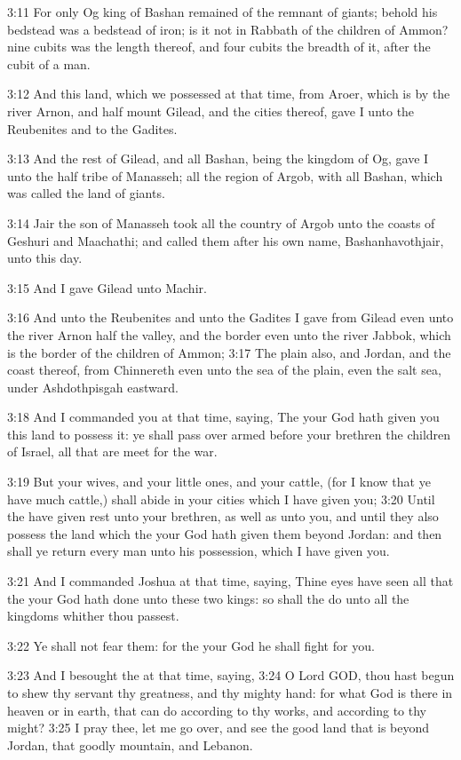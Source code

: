 3:11 For only Og king of Bashan remained of the remnant of giants; behold his bedstead was a bedstead of iron; is it not in Rabbath of the children of Ammon? nine cubits was the length thereof, and four cubits the breadth of it, after the cubit of a man.

3:12 And this land, which we possessed at that time, from Aroer, which is by the river Arnon, and half mount Gilead, and the cities thereof, gave I unto the Reubenites and to the Gadites.

3:13 And the rest of Gilead, and all Bashan, being the kingdom of Og, gave I unto the half tribe of Manasseh; all the region of Argob, with all Bashan, which was called the land of giants.

3:14 Jair the son of Manasseh took all the country of Argob unto the coasts of Geshuri and Maachathi; and called them after his own name, Bashanhavothjair, unto this day.

3:15 And I gave Gilead unto Machir.

3:16 And unto the Reubenites and unto the Gadites I gave from Gilead even unto the river Arnon half the valley, and the border even unto the river Jabbok, which is the border of the children of Ammon; 3:17 The plain also, and Jordan, and the coast thereof, from Chinnereth even unto the sea of the plain, even the salt sea, under Ashdothpisgah eastward.

3:18 And I commanded you at that time, saying, The \LORD your God hath given you this land to possess it: ye shall pass over armed before your brethren the children of Israel, all that are meet for the war.

3:19 But your wives, and your little ones, and your cattle, (for I know that ye have much cattle,) shall abide in your cities which I have given you; 3:20 Until the \LORD have given rest unto your brethren, as well as unto you, and until they also possess the land which the \LORD your God hath given them beyond Jordan: and then shall ye return every man unto his possession, which I have given you.

3:21 And I commanded Joshua at that time, saying, Thine eyes have seen all that the \LORD your God hath done unto these two kings: so shall the \LORD do unto all the kingdoms whither thou passest.

3:22 Ye shall not fear them: for the \LORD your God he shall fight for you.

3:23 And I besought the \LORD at that time, saying, 3:24 O Lord GOD, thou hast begun to shew thy servant thy greatness, and thy mighty hand: for what God is there in heaven or in earth, that can do according to thy works, and according to thy might?  3:25 I pray thee, let me go over, and see the good land that is beyond Jordan, that goodly mountain, and Lebanon.

